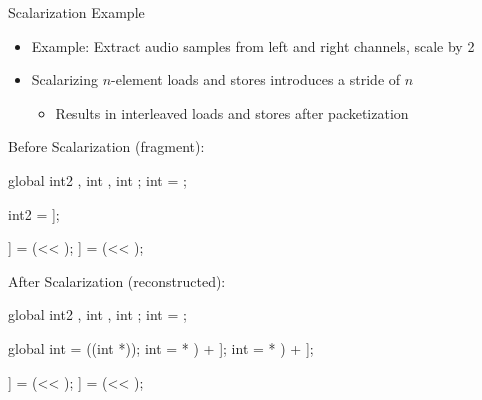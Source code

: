 \begin{frame}[fragile]{Scalarization Example}

\begin{itemize}
    \item Example: Extract audio samples from left and right channels, scale by 2
    \item Scalarizing $n$-element loads and stores introduces a stride of $n$
    \begin{itemize}
        \item Results in interleaved loads and stores after packetization
    \end{itemize}
\end{itemize}

\begin{minipage}[t]{0.45\linewidth}

\vspace{0.1ex}
Before Scalarization (fragment):
\begin{codebox}[commandchars=\\\[\]]
global int2 \uniform[*src], int \uniform[*left], int \uniform[*right];
int \varying[tid] = ;


int2 \varying[sample] = \uniform[src]\idx[\varying[tid]];


\uniform[left]\idx[\varying[tid]] = (\varying[sample.x] << \uniform[1]);
\uniform[right]\idx[\varying[tid]] = (\varying[sample.y] << \uniform[1]);
\end{codebox}

\end{minipage}
\hspace{1em}
\begin{minipage}[t]{0.49\linewidth}

\vspace{0.1ex}
After Scalarization (reconstructed):
\begin{codebox}[commandchars=\\\[\]]
global int2 \uniform[*src], int \uniform[*left], int \uniform[*right];
int \varying[tid] = ;

global int \uniform[*srcScalar] = ((int *)\uniform[src]);
int \varying[sampleLeft] = \uniform[srcScalar]\idx[(\varying[tid] * \uniform[2]) + \uniform[0]];
int \varying[sampleRight] = \uniform[srcScalar]\idx[(\varying[tid] * \uniform[2]) + \uniform[1]];

\uniform[left]\idx[\varying[tid]] = (\varying[sampleLeft] << \uniform[1]);
\uniform[right]\idx[\varying[tid]] = (\varying[sampleRight] << \uniform[1]);
\end{codebox}

\end{minipage}

\end{frame}
